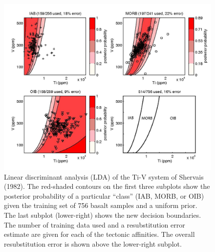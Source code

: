 \clearpage

\begin{figure}[htbp]
  \centering
  \includegraphics[width=600]{figures/Ti_V_lin.jpg}
  \caption[Linear discriminant analysis of the Ti-V system of Shervais (1982)]
{Linear  discriminant analysis (LDA)  of the  Ti-V system  of Shervais
(1982).  The red-shaded contours on  the first three subplots show the
posterior probability  of a particular  ``class'' (IAB, MORB,  or OIB)
given the training set of 756  basalt samples and a uniform prior. The
last  subplot (lower-right)  shows the  new decision  boundaries.  The
number of training  data used and a resubstitution  error estimate are
given for each of the tectonic affinities.  The overall resubstitution
error is shown above the lower-right subplot.}
  \label{fig:Ti_V_lin}
\end{figure}

